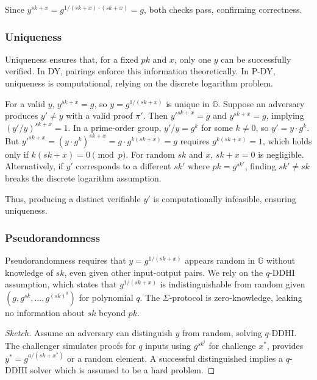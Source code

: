 Since $y^{sk + x} = g^{1/(sk + x) \cdot (sk + x)} = g$, both checks pass, confirming correctness.

\subsubsection{Uniqueness}

Uniqueness ensures that, for a fixed $pk$ and $x$, only one $y$ can be successfully verified. In DY, pairings enforce this information theoretically. In P-DY, uniqueness is computational, relying on the discrete logarithm problem.

For a valid $y$, $y^{sk + x} = g$, so $y = g^{1/(sk + x)}$ is unique in $\mathbb{G}$. Suppose an adversary produces $y' \neq y$ with a valid proof $\pi'$. Then $y'^{sk + x} = g$ and $y^{sk + x} = g$, implying $(y'/y)^{sk + x} = 1$. In a prime-order group, $y'/y = g^k$ for some $k \neq 0$, so $y' = y \cdot g^k$. But $y'^{sk + x} = (y \cdot g^k)^{sk + x} = g \cdot g^{k(sk + x)} = g$ requires $g^{k(sk + x)} = 1$, which holds only if $k(sk + x) = 0 \pmod{p}$. For random $sk$ and $x$, $sk + x = 0$ is negligible. Alternatively, if $y'$ corresponds to a different $sk'$ where $pk = g^{sk'}$, finding $sk' \neq sk$ breaks the discrete logarithm assumption.

Thus, producing a distinct verifiable $y'$ is computationally infeasible, ensuring uniqueness.

\subsubsection{Pseudorandomness}

Pseudorandomness requires that $y = g^{1/(sk + x)}$ appears random in $\mathbb{G}$ without knowledge of $sk$, even given other input-output pairs. We rely on the $q$-DDHI assumption, which states that $g^{1/(sk + x)}$ is indistinguishable from random given $(g, g^{sk}, \ldots, g^{(sk)^q})$ for polynomial $q$. 
The $\Sigma$-protocol is zero-knowledge, leaking no information about $sk$ beyond $pk$.

\begin{proof}[Sketch]
    Assume an adversary can distinguish $y$ from random, solving $q$-DDHI. The challenger simulates proofs for $q$ inputs using $g^{sk^i}$ for challenge $x^*$, provides $y^* = g^{a/(sk + x^*)}$ or a random element. A successful distinguished implies a $q$-DDHI solver which is assumed to be a hard problem.
\end{proof}


